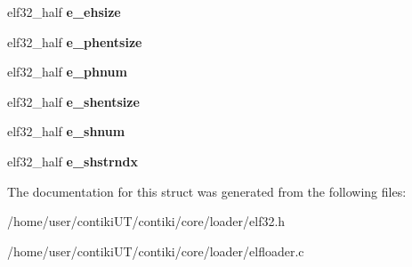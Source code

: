 \begin{DoxyCompactItemize}
\item 
\hypertarget{structelf32__ehdr_a33698f57f4f73a4f7659633fc11114fb}{}elf32\+\_\+half {\bfseries e\+\_\+ehsize}\label{structelf32__ehdr_a33698f57f4f73a4f7659633fc11114fb}

\item 
\hypertarget{structelf32__ehdr_a0deea8c06b17aff924a86adf23206dd7}{}elf32\+\_\+half {\bfseries e\+\_\+phentsize}\label{structelf32__ehdr_a0deea8c06b17aff924a86adf23206dd7}

\item 
\hypertarget{structelf32__ehdr_a24ad42f294e548d54ff91ae9de5bb729}{}elf32\+\_\+half {\bfseries e\+\_\+phnum}\label{structelf32__ehdr_a24ad42f294e548d54ff91ae9de5bb729}

\item 
\hypertarget{structelf32__ehdr_a2b8ae6d098c44146579dbe4c8e2d11c8}{}elf32\+\_\+half {\bfseries e\+\_\+shentsize}\label{structelf32__ehdr_a2b8ae6d098c44146579dbe4c8e2d11c8}

\item 
\hypertarget{structelf32__ehdr_a5f795d38ed810bad582d88c35b474cbf}{}elf32\+\_\+half {\bfseries e\+\_\+shnum}\label{structelf32__ehdr_a5f795d38ed810bad582d88c35b474cbf}

\item 
\hypertarget{structelf32__ehdr_a4537e3831f136b81a7a0d6260ad497a6}{}elf32\+\_\+half {\bfseries e\+\_\+shstrndx}\label{structelf32__ehdr_a4537e3831f136b81a7a0d6260ad497a6}

\end{DoxyCompactItemize}


The documentation for this struct was generated from the following files\+:\begin{DoxyCompactItemize}
\item 
/home/user/contiki\+U\+T/contiki/core/loader/elf32.\+h\item 
/home/user/contiki\+U\+T/contiki/core/loader/elfloader.\+c\end{DoxyCompactItemize}
